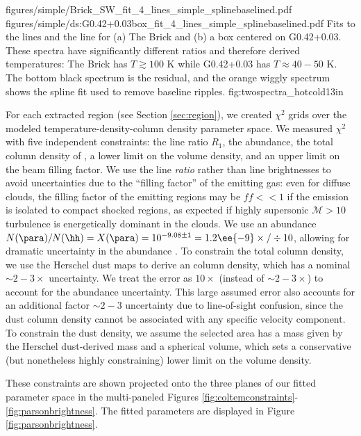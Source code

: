 \FigureTwo
{figures/simple/Brick_SW_fit_4_lines_simple_splinebaselined.pdf}
{figures/simple/ds:G0.42+0.03box_fit_4_lines_simple_splinebaselined.pdf}
{
Fits to the \para lines and the \methanol \fourtwotwo line for (a) The Brick
and (b) a box centered on G0.42+0.03.  These spectra have significantly
different ratios and therefore derived temperatures: The Brick has
$T\gtrsim100$ K while G0.42+0.03 has $T\approx40-50$ K.  The bottom black
spectrum is the residual, and the orange wiggly spectrum shows the spline fit
used to remove baseline ripples.}
{fig:twospectra_hotcold}{1}{3in}


For each extracted region (see Section \ref{sec:region}), we created $\chi^2$
grids over the modeled temperature-density-column density parameter space.  We
measured $\chi^2$ with five independent constraints: the line ratio $R_1$, the
\formaldehyde abundance, the total column density of \hh, a lower limit on the
\hh volume density, and an upper limit on the beam filling factor.  We use the
line \emph{ratio} rather than line brightnesses to avoid uncertainties due to
the ``filling factor'' of the emitting gas: even for diffuse clouds, the
filling factor of the emitting
regions may be $ff<<1$ if the emission is isolated to compact shocked regions,
as expected if highly supersonic $\mathcal{M}>10$ turbulence is energetically
dominant in the clouds.  We use an abundance $N(\para)/N(\hh) = X(\para) =
10^{-9.08\pm1} = 1.2\ee{-9} \times/\div 10$, allowing for dramatic uncertainty in
the \formaldehyde abundance
\citep{Ginsburg2013a,Carey1998a,Wootten1978a,Mundy1987a}.  To constrain the
total column density, we use the Herschel dust maps to derive an \hh column
density, which has a nominal $\sim2-3\times$ uncertainty.  We treat the error
as $10\times$ (instead of $\sim2-3\times$) to account for the abundance
uncertainty.  This large assumed error also accounts for an additional factor
$\sim2-3$ uncertainty due to line-of-sight confusion, since the dust column
density cannot be associated with any specific velocity component.  To
constrain the dust density, we assume the selected area has a mass given by the
Herschel dust-derived mass and a spherical volume, which sets a conservative
(but nonetheless highly constraining) lower limit on the volume density.

These constraints are shown projected onto the three planes of our fitted
parameter space in the multi-paneled Figures
\ref{fig:coltemconstraints}-\ref{fig:parsonbrightness}.  The fitted parameters
are displayed in Figure \ref{fig:parsonbrightness}.

